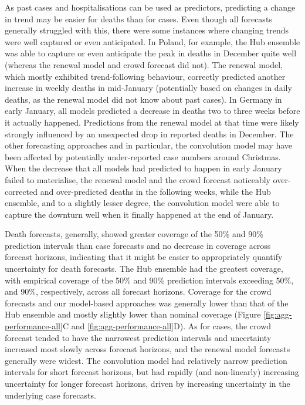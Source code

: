\documentclass[
]{article}
\begin{document}
As past cases and hospitalisations can be used as predictors, predicting a change in trend may be easier for deaths than for cases. Even though all forecasts generally struggled with this, there were some instances where changing trends were well captured or even anticipated. In Poland, for example, the Hub ensemble was able to capture or even anticipate the peak in deaths in December quite well (whereas the renewal model and crowd forecast did not). The renewal model, which mostly exhibited trend-following behaviour, correctly predicted another increase in weekly deaths in mid-January (potentially based on changes in daily deaths, as the renewal model did not know about past cases). In Germany in early January, all models predicted a decrease in deaths two to three weeks before it actually happened. Predictions from the renewal model at that time were likely strongly influenced by an unexpected drop in reported deaths in December. The other forecasting approaches and in particular, the convolution model may have been affected by potentially under-reported case numbers around Christmas. When the decrease that all models had predicted to happen in early January failed to materialise, the renewal model and the crowd forecast noticeably over-corrected and over-predicted deaths in the following weeks, while the Hub ensemble, and to a slightly lesser degree, the convolution model were able to capture the downturn well when it finally happened at the end of January.

Death forecasts, generally, showed greater coverage of the 50\% and 90\% prediction intervals than case forecasts and no decrease in coverage across forecast horizons, indicating that it might be easier to appropriately quantify uncertainty for death forecasts. The Hub ensemble had the greatest coverage, with empirical coverage of the 50\% and 90\% prediction intervals exceeding 50\%, and 90\%, respectively, across all forecast horizons. Coverage for the crowd forecasts and our model-based approaches was generally lower than that of the Hub ensemble and mostly slightly lower than nominal coverage (Figure \ref{fig:agg-performance-all}C and \ref{fig:agg-performance-all}D). As for cases, the crowd forecast tended to have the narrowest prediction intervals and uncertainty increased most slowly across forecast horizons, and the renewal model forecasts generally were widest. The convolution model had relatively narrow prediction intervals for short forecast horizons, but had rapidly (and non-linearly) increasing uncertainty for longer forecast horizons, driven by increasing uncertainty in the underlying case forecasts.
\end{document}
